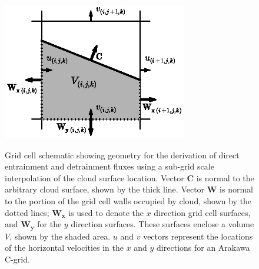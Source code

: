 \documentclass[12pt]{article}
\begin{document}
\begin{figure}[t]
  \noindent
  \includegraphics[width=19pc,angle=0]{./figures/gridcell_schematic}\\
  \caption{Grid cell schematic showing geometry for the derivation of direct 
entrainment and detrainment fluxes using a sub-grid scale interpolation of the 
cloud surface location.  Vector $\mathbf{C}$ is normal to the arbitrary cloud 
surface, shown by the thick line.  Vector $\mathbf{W}$ is normal to the portion 
of the grid cell walls occupied by cloud, shown by the dotted lines; 
$\mathbf{W_x}$ is used to denote the $x$ direction grid cell surfaces, and 
$\mathbf{W_y}$ for the $y$ direction surfaces.  These surfaces enclose a volume 
$V$, shown by the shaded area.  $u$ and $v$ vectors represent the locations of 
the horizontal velocities in the $x$ and $y$ directions for an Arakawa C-grid.}
  \label{fig:gridcell_schematic}
\end{figure}
\end{document}
